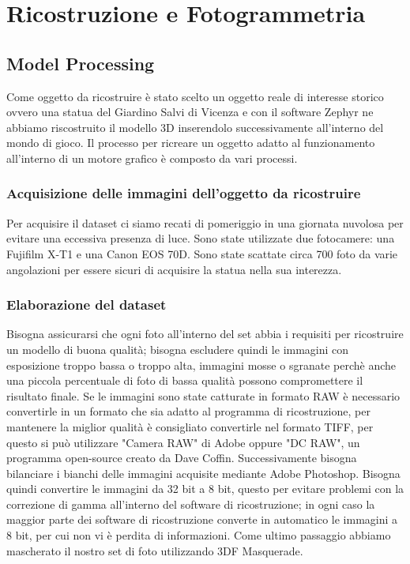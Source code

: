\documentclass[12pt]{report}
\begin{document}
\chapter{Ricostruzione e Fotogrammetria}
\section{Model Processing}
Come oggetto da ricostruire è stato scelto un oggetto reale di interesse storico ovvero una statua del Giardino Salvi di Vicenza e con il software Zephyr ne abbiamo riscostruito il modello 3D inserendolo successivamente all'interno del mondo di gioco.
Il processo per ricreare un oggetto adatto al funzionamento all'interno di un motore grafico  \`e composto da vari processi.
\subsection{Acquisizione delle immagini dell'oggetto da ricostruire}
Per acquisire il dataset ci siamo recati di pomeriggio in una giornata nuvolosa per evitare una eccessiva presenza di luce. Sono state utilizzate due fotocamere: una Fujifilm X-T1 e una Canon EOS 70D. Sono state scattate circa 700 foto da varie angolazioni per essere sicuri di acquisire la statua nella sua interezza.
\subsection{Elaborazione del dataset}
Bisogna assicurarsi che ogni foto all'interno del set abbia i requisiti per ricostruire un modello di buona qualit\`a; bisogna escludere quindi le immagini con esposizione troppo bassa o troppo alta, immagini mosse o sgranate perch\`e  anche una piccola percentuale di foto di bassa qualit\`a possono compromettere il risultato finale.
\newline
Se le immagini sono state catturate in formato RAW \`e necessario convertirle in un formato che sia adatto al programma di ricostruzione, per mantenere la miglior qualit\`a \`e consigliato convertirle nel formato TIFF, per questo si pu\`o utilizzare "Camera RAW" di Adobe oppure "DC RAW", un programma open-source creato da Dave Coffin.
\newline
Successivamente bisogna bilanciare i bianchi delle immagini acquisite mediante Adobe Photoshop.
\newline
Bisogna quindi convertire le immagini da 32 bit a 8 bit, questo per evitare problemi con la correzione di gamma all'interno del software di ricostruzione; in ogni caso la maggior parte dei software di ricostruzione converte in automatico le immagini a 8 bit, per cui non vi \`e perdita di informazioni.
\newline
Come ultimo passaggio abbiamo mascherato il nostro set di foto utilizzando 3DF Masquerade.
\end{document}
